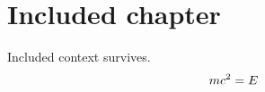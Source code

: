 \section{Included chapter}
Included context survives.
\begin{equation}mc^2=E\label{eq:local}\end{equation}
